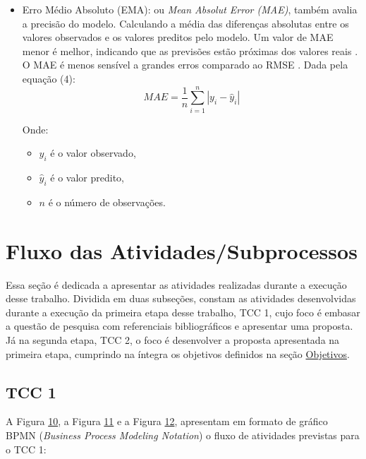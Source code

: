 \begin{itemize}
    \item Erro Médio Absoluto (EMA): ou \textit{Mean Absolut Error (MAE)}, também avalia a precisão do modelo.
    Calculando a média das diferenças absolutas entre os 
    valores observados e os valores preditos pelo modelo.
    Um valor de MAE menor é melhor, indicando que as previsões estão próximas dos valores reais \cite{wang2018analysis}. 
    O MAE é menos sensível a grandes erros comparado ao RMSE \cite{chai2014root}.
    Dada pela equação (4):
    \[
    MAE = \frac{1}{n} \sum_{i=1}^{n} |y_i - \hat{y}_i| \tag{4}
    \]

    Onde:
    \begin{itemize}
        \item \(y_i\) é o valor observado,
        \item \(\hat{y}_i\) é o valor predito,
        \item \(n\) é o número de observações.
    \end{itemize}

\end{itemize}

\section{Fluxo das Atividades/Subprocessos}\label{sec:fluxoatv}

Essa seção é dedicada a apresentar as atividades realizadas durante a execução desse trabalho. Dividida em duas subseções,
constam as atividades desenvolvidas durante a execução da primeira etapa desse trabalho, TCC 1, cujo foco é embasar a 
questão de pesquisa com referenciais bibliográficos e apresentar uma proposta. Já na segunda etapa, TCC 2, o foco é 
desenvolver a proposta apresentada na primeira etapa, cumprindo na íntegra os objetivos definidos na seção 
\hyperref[sec:objetivos]{Objetivos}.

\subsection{TCC 1}\label{subsec:tcc1}

A Figura \hyperref[fig:bpmnTcc1]{10}, a Figura \hyperref[fig:subproccesspoc]{11} e a Figura \hyperref[fig:subproccessteo]{12}, apresentam em formato de gráfico BPMN (\textit{Business Process Modeling Notation}) 
o fluxo de atividades previstas para o TCC 1:

